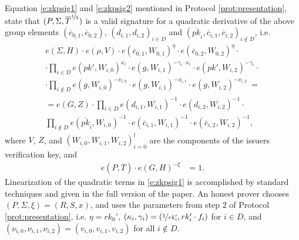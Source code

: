 \documentclass[runningheads]{llncs}
\begin{document}
Equation \eqref{e:zkpsig1} and \eqref{e:zkpsig2} mentioned in Protocol \ref{prot:presentation}, state that $(P, \Sigma, \overline T^{\nicefrac{1}{\xi}})$ is a valid signature for a quadratic derivative of the above group elements  $\left(\overline c_{0,1}, \overline c_{0,2}\right)$, $(d_{i,1}, d_{i,2})_{i\in D}$ and $(\overline{pk}_i,\overline c_{i,1},\overline c_{i,2})_{i\not\in D}$, 
i.e.
\begin{multline}
\label{e:zkpsig1}
e(\Sigma, H)\cdot  e(\rho, V) \cdot e(\overline c_{0,1}, W_{0,1})^{\eta} \cdot e(\overline c_{0,2},W_{0,2})^{\eta}\cdot 
\\
\cdot 
\prod_{i\in D} e\left(pk',W_{i,0}\right)^{\kappa_{i}} \cdot e(g, W_{i,1})^{-\gamma_{i}\cdot \kappa_i} \cdot e(pk', W_{i,2})^{-\gamma_i}\cdot
\\
\cdot \prod_{i\not\in D} e\left(g,W_{i,0}\right)^{-\nu_{i,0}} \cdot e(g, W_{i,1})^{-\nu_{i,1}} \cdot e(g, W_{i,2})^{-\nu_{i,2}}\ =
\\ 
= e(G,Z)
\cdot\prod_{i\in D} e(d_{i,1}, W_{i,1})^{-1} \cdot  e(d_{i,2}, W_{i,2})^{-1} \cdot \\
\prod_{i\not\in D}  e(\overline{pk}_i, W_{i,0})^{-1} \cdot   e(\overline c_{i,1}, W_{i,1})^{-1} \cdot  e(\overline c_{i,2}, W_{i,2})^{-1},
\end{multline}
where $V$, $Z$, and $(W_{i,0}, W_{i,1}, W_{i,2})_{i=0}^l$ are the components of the issuers verification key, and
\begin{align}
\label{e:zkpsig2}
e(P, \overline T) \cdot  e(G,H)^{-\xi} &= 1.
\end{align}
\ifCANS
Linearization of the quadratic terms in \eqref{e:zkpsig1} is accomplished by standard techniques and given in the full version of the paper.
An honest prover chooses $(P,\Sigma, \xi) = (R,S,x)$, and uses the parameters from step 2 of Protocol \ref{prot:presentation}, i.e.  $\eta = rk_0'$, $\left(\kappa_{i},\gamma_{i}\right) = \left(\nicefrac{1}{rk_i'}, rk_i'\cdot f_{i}\right)$ for $i\in D$, and $\left(\nu_{i,0},\nu_{i,1},\nu_{i,2}\right) = \left(v_{i,0}, v_{i,1}, v_{i,2}\right)$ for all $i\not\in D$.
\end{document}
